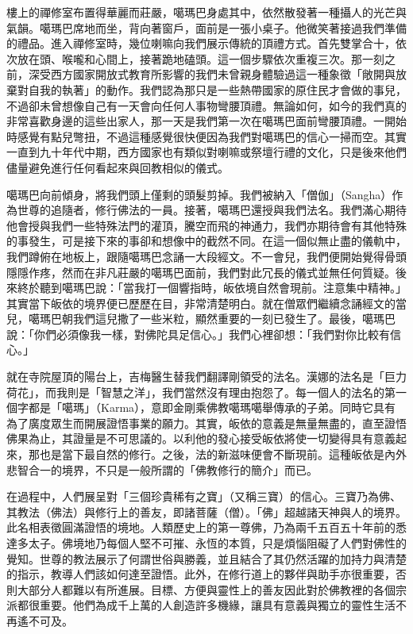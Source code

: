樓上的禪修室布置得華麗而莊嚴，噶瑪巴身處其中，依然散發著一種攝人的光芒與氣韻。噶瑪巴席地而坐，背向著窗戶，面前是一張小桌子。他微笑著接過我們準備的禮品。進入禪修室時，幾位喇嘛向我們展示傳統的頂禮方式。首先雙掌合十，依次放在頭、喉嚨和心間上，接著跪地磕頭。這一個步驟依次重複三次。那一刻之前，深受西方國家開放式教育所影響的我們未曾親身體驗過這一種象徵「敞開與放棄對自我的執著」的動作。我們認為那只是一些熱帶國家的原住民才會做的事兒，不過卻未曾想像自己有一天會向任何人事物彎腰頂禮。無論如何，如今的我們真的非常喜歡身邊的這些出家人，那一天是我們第一次在噶瑪巴面前彎腰頂禮。一開始時感覺有點兒彆扭，不過這種感覺很快便因為我們對噶瑪巴的信心一掃而空。其實一直到九十年代中期，西方國家也有類似對喇嘛或祭壇行禮的文化，只是後來他們儘量避免進行任何看起來與回教相似的儀式。

噶瑪巴向前傾身，將我們頭上僅剩的頭髮剪掉。我們被納入「僧伽」（Sangha）作為世尊的追隨者，修行佛法的一員。接著，噶瑪巴還授與我們法名。我們滿心期待他會授與我們一些特殊法門的灌頂，騰空而飛的神通力，我們亦期待會有其他特殊的事發生，可是接下來的事卻和想像中的截然不同。在這一個似無止盡的儀軌中，我們蹲俯在地板上，跟隨噶瑪巴念誦一大段經文。不一會兒，我們便開始覺得骨頭隱隱作疼，然而在非凡莊嚴的噶瑪巴面前，我們對此冗長的儀式並無任何質疑。後來終於聽到噶瑪巴說：「當我打一個響指時，皈依境自然會現前。注意集中精神。」其實當下皈依的境界便已歷歷在目，非常清楚明白。就在僧眾們繼續念誦經文的當兒，噶瑪巴朝我們這兒撒了一些米粒，顯然重要的一刻已發生了。最後，噶瑪巴說：「你們必須像我一樣，對佛陀具足信心。」我們心裡卻想：「我們對你比較有信心。」

就在寺院屋頂的陽台上，吉梅醫生替我們翻譯剛領受的法名。漢娜的法名是「巨力荷花」，而我則是「智慧之洋」，我們當然沒有理由抱怨了。每一個人的法名的第一個字都是「噶瑪」（Karma），意即金剛乘佛教噶瑪噶舉傳承的子弟。同時它具有為了廣度眾生而開展證悟事業的願力。其實，皈依的意義是無量無盡的，直至證悟佛果為止，其證量是不可思議的。以利他的發心接受皈依將使一切變得具有意義起來，那也是當下最自然的修行。之後，法的新滋味便會不斷現前。這種皈依是內外悲智合一的境界，不只是一般所謂的「佛教修行的簡介」而已。


在過程中，人們展呈對「三個珍貴稀有之寶」（又稱三寶）的信心。三寶乃為佛、其教法（佛法）與修行上的善友，即諸菩薩（僧）。「佛」超越諸天神與人的境界。此名相表徵圓滿證悟的境地。人類歷史上的第一尊佛，乃為兩千五百五十年前的悉達多太子。佛境地乃每個人堅不可摧、永恆的本質，只是煩惱阻礙了人們對佛性的覺知。世尊的教法展示了何謂世俗與勝義，並且結合了其仍然活躍的加持力與清楚的指示，教導人們該如何達至證悟。此外，在修行道上的夥伴與助手亦很重要，否則大部分人都難以有所進展。目標、方便與靈性上的善友因此對於佛教裡的各個宗派都很重要。他們為成千上萬的人創造許多機緣，讓具有意義與獨立的靈性生活不再遙不可及。

